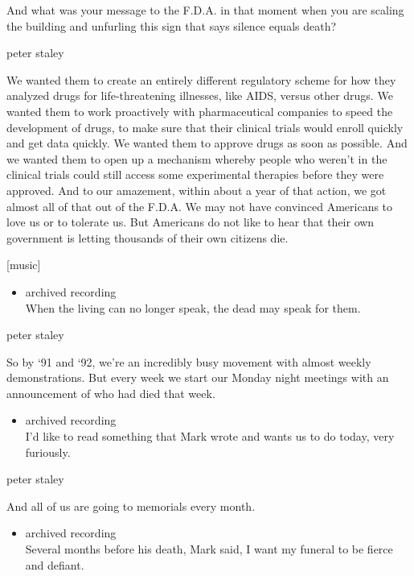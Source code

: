 And what was your message to the F.D.A. in that moment when you are
scaling the building and unfurling this sign that says silence equals
death?

peter staley

We wanted them to create an entirely different regulatory scheme for how
they analyzed drugs for life-threatening illnesses, like AIDS, versus
other drugs. We wanted them to work proactively with pharmaceutical
companies to speed the development of drugs, to make sure that their
clinical trials would enroll quickly and get data quickly. We wanted
them to approve drugs as soon as possible. And we wanted them to open up
a mechanism whereby people who weren't in the clinical trials could
still access some experimental therapies before they were approved. And
to our amazement, within about a year of that action, we got almost all
of that out of the F.D.A. We may not have convinced Americans to love us
or to tolerate us. But Americans do not like to hear that their own
government is letting thousands of their own citizens die.

{[}music{]}

\begin{itemize}
\tightlist
\item
  archived recording\\
  When the living can no longer speak, the dead may speak for them.
\end{itemize}

peter staley

So by `91 and `92, we're an incredibly busy movement with almost weekly
demonstrations. But every week we start our Monday night meetings with
an announcement of who had died that week.

\begin{itemize}
\tightlist
\item
  archived recording\\
  I'd like to read something that Mark wrote and wants us to do today,
  very furiously.
\end{itemize}

peter staley

And all of us are going to memorials every month.

\begin{itemize}
\tightlist
\item
  archived recording\\
  Several months before his death, Mark said, I want my funeral to be
  fierce and defiant.
\end{itemize}

